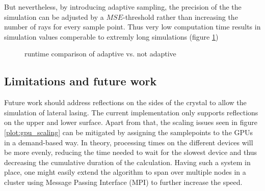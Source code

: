 But nevertheless, by introducing adaptive sampling, the precision of the the simulation
can be adjusted by a $MSE$-threshold rather than increasing the number
of rays for every sample point. Thus very low computation time results in
simulation values comperable to extremly long simulations (figure \ref{plot:adaptive_runtime})\\
\begin{figure}[H]
  \centerline{
    }
  \caption{runtime comparison of adaptive vs. not adaptive }
  \label{plot:adaptive_runtime}
\end{figure}



\subsection{Limitations and future work}
\label{subsec:limitations}

Future work should address reflections on the sides of the crystal to allow the
simulation of lateral lasing. The current implementation only supports
reflections on the upper and lower surface.
Apart from that, the scaling issues seen in figure \ref{plot:gpu_scaling} can be
mitigated by assigning the samplepoints to the GPUs in a demand-based way.  In
theory, processing times on the different devices will be more evenly, reducing
the time needed to wait for the slowest device and thus decreasing the
cumulative duration of the calculation. Having such a system in place, one might
easily extend the algorithm to span over multiple nodes in a cluster using
Message Passing Interface (MPI)\cite{MPI} to further increase the speed.
